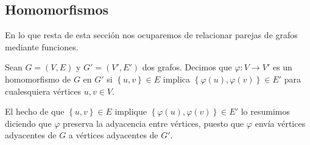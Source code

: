 \subsection{Homomorfismos}
En lo que resta de esta sección nos ocuparemos de relacionar parejas de grafos mediante funciones.
\begin{Def}\label{Def:homomorfismo}
   Sean $G=(V,E)$ y $G'=(V',E')$ dos grafos. Decimos que $\varphi:V\to V'$ es un homomorfismo de $G$ en $G'$ si $\left\lbrace u,v\right\rbrace\in E$ implica $\left\lbrace \varphi(u),\varphi(v) \right\rbrace\in E'$ para cualesquiera vértices $u,v\in V$.
\end{Def}
El hecho de que $\left\lbrace u,v \right\rbrace\in E$ implique $\left\lbrace \varphi(u),\varphi(v)\right\rbrace\in E'$ lo resumimos diciendo que $\varphi$ preserva la adyacencia entre vértices, puesto que $\varphi$ envía vértices adyacentes de $G$ a vértices adyacentes de $G'$.

